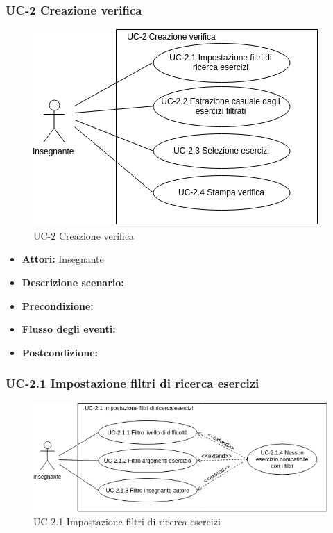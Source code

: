 \subsubsection{UC-2 Creazione verifica}
\begin{figure}[htbp]
	\centering
	\includegraphics[scale=0.7]{images/UC-2.png}
	\caption{UC-2 Creazione verifica}
\end{figure}
\begin{itemize}
		\item \textbf{Attori: } Insegnante
		\item \textbf{Descrizione scenario: } 
		\item \textbf{Precondizione: }
		\item \textbf{Flusso degli eventi: }
		\item \textbf{Postcondizione: }
\end{itemize}
\newpage
\subsubsection{UC-2.1 Impostazione filtri di ricerca esercizi}

\begin{figure}[htbp]
	\centering
	\includegraphics[scale=0.7]{images/UC-2_1.png}
	\caption{UC-2.1 Impostazione filtri di ricerca esercizi}
\end{figure}

